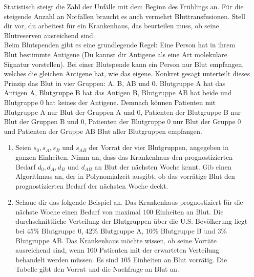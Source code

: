 \documentclass{uebung_cs}
\begin{document}
\begin{aufgabe}
\begin{figure}[ht]
\begin{minipage}[b]{0.5\textwidth}
    	
    	\end{minipage}
    \end{figure}
\end{aufgabe}

\begin{aufgabe}[Blutspende]
    Statistisch steigt die Zahl der Unfälle mit dem Beginn des Frühlings an. Für die steigende Anzahl an Notfällen braucht es auch vermehrt Bluttransfusionen. Stell dir vor, du arbeitest für ein Krankenhaus, das beurteilen muss, ob seine Blutreserven ausreichend sind.\\
    Beim Blutspenden gibt es eine grundlegende Regel: Eine Person hat in ihrem Blut bestimmte Antigene (Du kannst dir Antigene als eine Art molekulare Signatur vorstellen). Bei einer Blutspende kann ein Person nur Blut empfangen, welches die gleichen Antigene hat, wie das eigene. Konkret gesagt unterteilt dieses Prinzip das Blut in vier Gruppen: A, B, AB und 0. Blutgruppe A hat das Antigen A, Blutgruppe B hat das Antigen B, Blutgruppe AB hat beide und Blutgruppe 0 hat keines der Antigene. Demnach können Patienten mit Blutgruppe A nur Blut der Gruppen A und 0, Patienten der Blutgruppe B nur Blut der Gruppen B und 0, Patienten der Blutgruppe 0 nur Blut der Gruppe 0 und Patienten der Gruppe AB Blut aller Blutgruppen empfangen.
    \begin{enumerate}
    	\item Seien $s_0,s_A,s_B$ und $s_{AB}$ der Vorrat der vier Blutgruppen, angegeben in ganzen Einheiten. Nimm an, dass das Krankenhaus den prognostizierten Bedarf $d_0, d_A,d_B$ und $d_{AB}$ an Blut der nächsten Woche kennt. Gib einen Algorithmus an, der in Polynomialzeit ausgibt, ob das vorrätige Blut den prognostizierten Bedarf der nächsten Woche deckt.\\
    	\item Schaue dir das folgende Beispiel an. Das Krankenhaus prognostiziert für die nächste Woche einen Bedarf von maximal $100$ Einheiten an Blut. Die durchschnittliche Verteilung der Blutgruppen über die U.S.-Bevölkerung liegt bei $45\%$ Blutgruppe 0, $42\%$ Blutgruppe A, $10\%$ Blutgruppe B und $3\%$ Blutgruppe AB. Das Krankenhaus möchte wissen, ob seine Vorräte ausreichend sind, wenn $100$ Patienten mit der erwarteten Verteilung behandelt werden müssen. Es sind $105$ Einheiten an Blut vorrätig. Die Tabelle gibt den Vorrat und die Nachfrage an Blut an.
    	

\end{enumerate}
\end{aufgabe}
\end{document}
